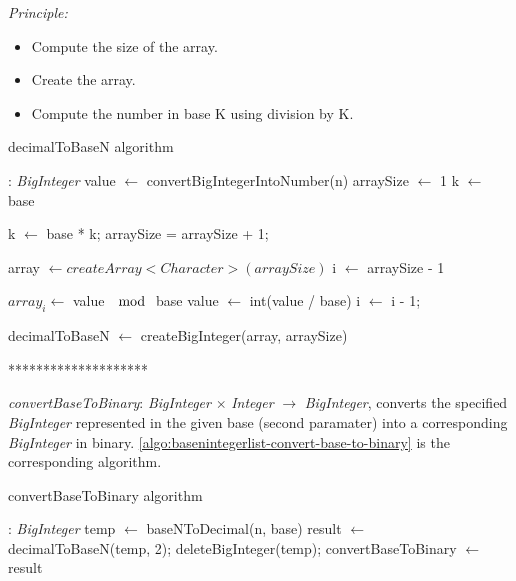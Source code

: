\documentclass[book, nodocumentinfo]{upmethodology-document}
\newcommand{\separator}{\centerline{********************}}
\begin{document}
\emph{Principle:}
\begin{itemize}
    \item Compute the size of the array.
    \item Create the array.
    \item Compute the number in base K using division by K.
\end{itemize}

\begin{algorithm}[H]
    \caption{decimalToBaseN algorithm}
    \label{algo:basenintegerlist-decimal-to-base}

    \begin{algorithmic}
         : \emph{BigInteger}
            \State value \(\leftarrow\) convertBigIntegerIntoNumber(n)
            \State arraySize \(\leftarrow\) 1
            \State k \(\leftarrow\) base

                \State k \(\leftarrow\) base * k;
                \State arraySize = arraySize + 1;
            \EndWhile

            \State array \(\leftarrow createArray<Character>(arraySize)\)
            \State i \(\leftarrow\) arraySize - 1

            \Repeat
                \State \(array_{i} \leftarrow \) value \(\mod\) base
                \State value \(\leftarrow\) int(value / base)
                \State i \(\leftarrow\) i - 1;

            \State decimalToBaseN \(\leftarrow\) createBigInteger(array, arraySize)
        \EndFunction
    \end{algorithmic}
\end{algorithm}

\separator

\emph{convertBaseToBinary}: \emph{BigInteger} \(×\) \emph{Integer} \(\rightarrow\) \emph{BigInteger},
converts the specified \emph{BigInteger} represented in the given base (second paramater) into a corresponding \emph{BigInteger}
in binary.
\ref{algo:basenintegerlist-convert-base-to-binary} is the corresponding algorithm.

\begin{algorithm}[H]
    \caption{convertBaseToBinary algorithm}
    \label{algo:basenintegerlist-convert-base-to-binary}

    \begin{algorithmic}
         : \emph{BigInteger}
            \State temp \(\leftarrow\) baseNToDecimal(n, base)
            \State result \(\leftarrow\) decimalToBaseN(temp, 2);
            \State deleteBigInteger(temp);
            \State convertBaseToBinary \(\leftarrow\) result
        \EndFunction
    \end{algorithmic}
\end{algorithm}
\end{document}
